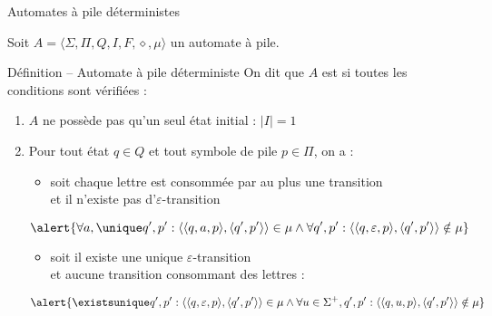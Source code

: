 \begin{frame}{Automates à pile déterministes}

  \vspace{-1mm}
  \small 
  Soit $A = \langle \Sigma, \Pi, Q, I, F, \diamond, \mu \rangle$ un automate à pile.

  \vspace{-1mm}
  \begin{block}{Définition -- Automate à pile déterministe}
    On dit que $A$ est  si toutes les conditions sont vérifiées : 
    \begin{enumerate}
    \item $A$ ne possède pas qu'un seul état initial : \alert{$|I| = 1$}
    \item Pour tout état $q \in Q$ et tout symbole de pile $p \in \Pi$, on a : 
      \begin{itemize}
      \item soit chaque lettre est consommée par au plus une transition \\
        et il n'existe pas d'$\varepsilon$-transition \\
      \end{itemize}
      $$\alert{\forall a, \unique q', p' : \langle \langle q, a, p\rangle, \langle q', p'\rangle \rangle \in \mu \land \forall q', p' : \langle \langle q, \varepsilon, p\rangle, \langle q', p'\rangle \rangle \notin \mu}$$
      \begin{itemize}
      \item \vspace{-5mm}soit il existe une unique $\varepsilon$-transition\\
        et aucune transition consommant des lettres :
      \end{itemize}
      $$\alert{\existsunique q', p' : \langle \langle q, \varepsilon, p\rangle, \langle q', p'\rangle \rangle \in \mu \land \forall u\in \Sigma^+, q', p' : \langle \langle q, u, p\rangle, \langle q', p'\rangle \rangle \notin \mu}$$
    \end{enumerate}
      

% 
  \end{block}


\end{frame}
